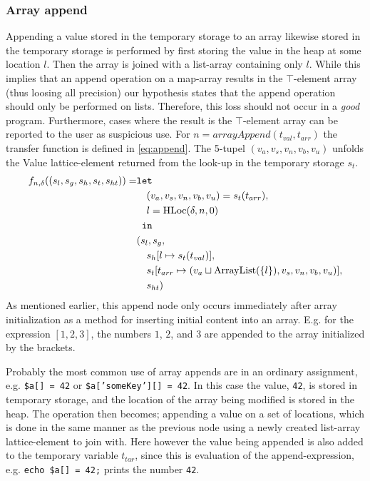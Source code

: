 \subsubsection{Array append}
Appending a value stored in the temporary storage to an array likewise stored in the temporary storage is performed by first storing the value in the heap at some location $l$. Then the array is joined with a list-array containing only $l$. While this implies that an append operation on a map-array results in the $\top$-element array (thus loosing all precision) our hypothesis states that the append operation should only be performed on lists. Therefore, this loss should not occur in a \emph{good} program. Furthermore, cases where the result is the $\top$-element array can be reported to the user as suspicious use. For $n = \mathit{arrayAppend}(t_{val},t_{arr})$ the transfer function is defined in \ref{eq:append}. The 5-tupel $(v_a, v_s, v_n, v_b, v_u)$ unfolds the Value lattice-element returned from the look-up in the temporary storage $s_t$.
\begin{align}
f_{n,\delta}((s_l, s_g, s_h, s_t, s_{ht})) = & \texttt{let } \notag\\
                                    & \quad (v_a,v_s,v_n,v_b,v_u) = s_t(t_{arr}), \notag\\
                                    & \quad l = \text{HLoc}(\delta, n, 0)\notag\\
                                    & \texttt{ in } \notag\\
                                    &(s_l,s_g,\notag\\
                                    &\quad s_h[l\mapsto s_t(t_{val})], \notag\\
                                    &\quad s_t[t_{arr} \mapsto (v_a \sqcup \text{ArrayList}(\{l\}),v_s, v_n, v_b, v_u)],\notag\\
                                    &\quad s_{ht}) \label{eq:append}
\end{align}
As mentioned earlier, this append node only occurs immediately after array initialization as a method for inserting initial content into an array. E.g. for the expression $[1,2,3]$, the numbers $1$, $2$, and $3$ are appended to the array initialized by the brackets.

Probably the most common use of array appends are in an ordinary assignment, e.g. \texttt{\$a[] = 42} or \texttt{\$a['someKey'][] = 42}. In this case the value, \texttt{42}, is stored in temporary storage, and the location of the array being modified is stored in the heap. The operation then becomes; appending a value on a set of locations, which is done in the same manner as the previous node using a newly created list-array lattice-element to join with. Here however the value being appended is also added to the temporary variable $t_{tar}$, since this is evaluation of the append-expression, e.g. \texttt{echo \$a[] = 42;} prints the number \texttt{42}. 

